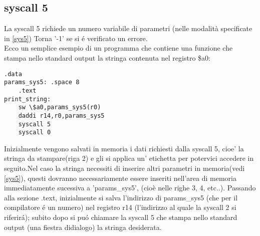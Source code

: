 \documentclass[12pt]{report}
\begin{document}
\subsection{syscall 5}
La syscall 5 richiede un numero variabile di parametri (nelle modalità specificate in  \ref{sys5})
Torna '-1' se si \'{e} verificato un errore.\\ 
Ecco un semplice esempio di un programma che contiene una funzione che stampa nello standard output
la stringa contenuta nel registro \$a0:
\begin{lstlisting}[caption={syscall5}, label={code:syscall5}, style={mips}]
    .data
params_sys5: .space 8	  			
	.text
print_string:
	sw \$a0,params_sys5(r0)	
	daddi r14,r0,params_sys5
	syscall 5
	syscall 0				
\end{lstlisting}
Inizialmente vengono salvati in memoria i dati richiesti dalla syscall 5, cioe'
la stringa da stampare(riga 2) e gli si applica un' etichetta per potervici
accedere in seguito.Nel caso la stringa necessiti di inserire altri parametri in
memoria(vedi \ref{sys5}), questi dovranno necessariamente essere inseriti
nell'area di memoria immediatamente sucessiva a 'params\_sys5', (cioè nelle
righe 3, 4, etc..).  Passando alla sezione .text, inizialmente si salva
l'indirizzo di params\_sys5 (che per il compilatore \'{e} un numero) nel
registro r14 (l'indirizzo al quale la syscall 2 si riferir\'{a}); subito dopo si
pu\'{o} chiamare la syscall 5 che stampa nello standard output (una fiestra
didialogo) la stringa desiderata.
\end{document}
